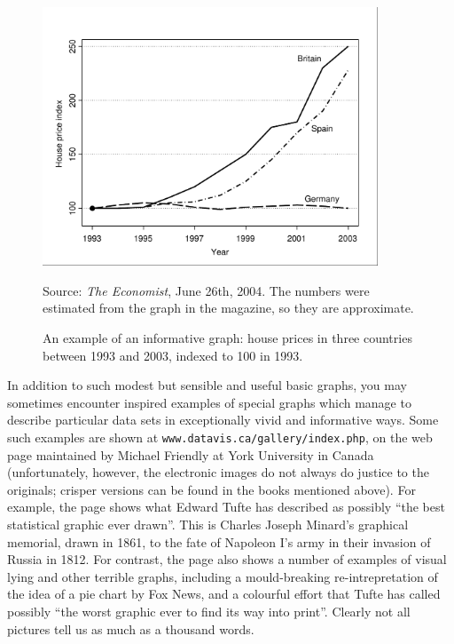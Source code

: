 \begin{figure}
\caption{An example of an informative graph: house prices in three
countries between 1993 and 2003, indexed to 100 in 1993.}
\label{f_houseprices}
\begin{center}
\includegraphics[width=10cm]{houseprices}
\end{center}
\vspace*{-2ex}
{\footnotesize Source: \emph{The Economist}, June 26th, 2004. The
numbers were estimated from the graph in the magazine, so they are
approximate.}
\end{figure}

In addition to such modest but sensible and useful basic graphs, you may
sometimes encounter inspired examples of
special graphs which manage to describe particular data sets in
exceptionally vivid and informative ways. Some such examples are shown
at \texttt{www.datavis.ca/gallery/index.php}, on the web page
maintained by Michael Friendly at York University in
Canada (unfortunately, however, the electronic images do not always
do justice to the originals; crisper versions can be found in the books
mentioned above). For example, the page shows what Edward Tufte has
described as possibly ``the best statistical graphic ever drawn''. This
is Charles Joseph Minard's graphical memorial, drawn in 1861, to the
fate of Napoleon I's army in their invasion of Russia in 1812.
For
contrast, the page also shows a number of examples of visual lying and
other terrible graphs, including a mould-breaking re-intrepretation of
the idea of a pie chart by Fox News, and
a colourful effort that Tufte has called possibly ``the
worst graphic ever to find its way into print''. Clearly not all
pictures tell us as much as a thousand words.



